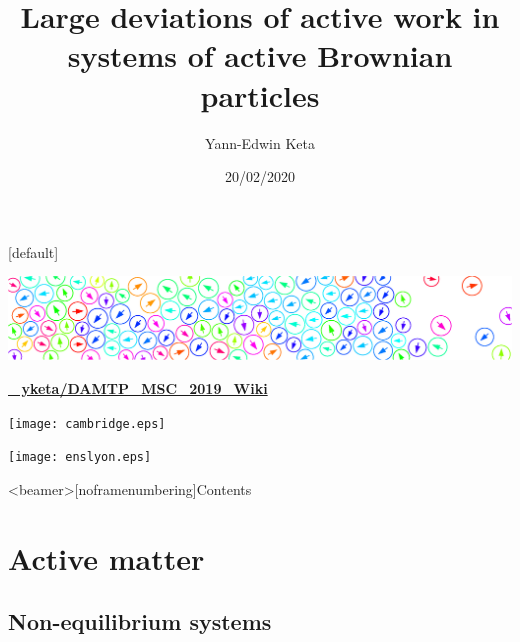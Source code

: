 \documentclass{beamer}
\title{Large deviations of active work in systems of active Brownian particles}
\author{Yann-Edwin Keta}
\date{20/02/2020}
\begin{document}

{
\makeatletter
    [default]
    \def\beamer@entrycode{\vspace*{-\headheight}}
\begin{frame}[noframenumbering]

\vspace*{-4mm}
{
 \hspace*{-\beamerleftmargin}%
\begin{minipage}{\paperwidth}
\includegraphics[width=\paperwidth]{header.eps}
\end{minipage}
}

\titlepage

\vspace{-20pt}
\begin{center}
\href{https://github.com/yketa/DAMTP_MSC_2019_Wiki}{\bf{\footnotesize \faGithub~ yketa/DAMTP\_MSC\_2019\_Wiki}}
\end{center}

\hfill
\begin{minipage}{0.5\linewidth}
\centering
\texttt{[image: cambridge.eps]}
\end{minipage}
\hfill
\begin{minipage}{0.42\linewidth}
\centering
\texttt{[image: enslyon.eps]}
\end{minipage}
\hfill

\end{frame}
}


{\footerwithoutframenumber
\begin{frame}<beamer>[noframenumbering]{Contents}
  \tableofcontents
\end{frame}
}


\section{Active matter}

\subsection{Non-equilibrium systems}
\end{document}
